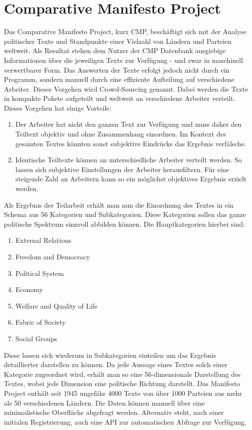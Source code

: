 \section{Comparative Manifesto Project}
Das Comparative Manifesto Project, kurz CMP, beschäftigt sich mit der Analyse politischer Texte und Standpunkte einer Vielzahl von Ländern und Parteien weltweit. Als Resultat stehen dem Nutzer der CMP Datenbank ausgiebige Informationen über die jeweiligen Texte zur Verfügung - und zwar in maschinell verwertbarer Form.
Das Auswerten der Texte erfolgt jedoch nicht durch ein Programm, sondern manuell durch eine effiziente Aufteilung auf verschiedene Arbeiter. Dieses Vorgehen wird Crowd-Sourcing genannt. Dabei werden die Texte in kompakte Pakete aufgeteilt und weltweit an verschiedene Arbeiter verteilt. Dieses Vorgehen hat einige Vorteile:
\begin{enumerate}
\item Der Arbeiter hat nicht den ganzen Text zur Verfügung und muss daher den Teiltext objektiv und ohne Zusammenhang einordnen. Im Kontext des gesamten Textes könnten sonst subjektive Eindrücke das Ergebnis verfälsche.
\item Identische Teiltexte können an unterschiedliche Arbeiter verteilt werden. So lassen sich subjektive Einstellungen der Arbeiter herausfiltern. Für eine steigende Zahl an Arbeitern kann so ein möglichst objektives Ergebnis erzielt werden.
\end{enumerate}
Als Ergebnis der Teilarbeit erhält man nun die Einordnung des Textes in ein Schema aus 56 Kategorien und Subkategorien. Diese Kategorien sollen das ganze politische Spektrum sinnvoll abbilden können. Die Hauptkategorien hierbei sind:
\begin{enumerate}
\item External Relations
\item Freedom and Democracy
\item Political System
\item Economy
\item Welfare and Quality of Life
\item Fabric of Society
\item Social Groups
\end{enumerate}
Diese lassen sich wiederum in Subkategorien einteilen um das Ergebnis detaillierter darstellen zu können. Da jede Aussage eines Textes solch einer Kategorie zugeordnet wird, erhält man so eine 56-dimensionale Darstellung des Textes, wobei jede Dimension eine politische Richtung darstellt.
Das Manifesto Project enthält seit 1945 ungefähr 4000 Texte von über 1000 Parteien aus mehr als 50 verschiedenen Ländern.
Die Daten können manuell über eine minimalistische Oberfläche abgefragt werden. Alternativ steht, nach einer initialen Registrierung, auch eine API zur automatischen Abfrage zur Verfügung.

